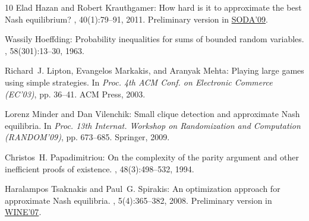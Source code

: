 \begin{thebibliography}{10}
{\sc Elad Hazan and Robert Krauthgamer}: How hard is it to approximate the best
  {N}ash equilibrium?
, 40(1):79--91, 2011.
\newblock Preliminary version in
  \href{http://dl.acm.org/citation.cfm?id=1496849}{SODA'09}.
\newblock [\epfmtdoi{10.1137/090766991}]

{\sc Wassily Hoeffding}: Probability inequalities for sums of bounded random
  variables.
, 58(301):13--30, 1963.
\newblock [\epfmtdoi{10.1080/01621459.1963.10500830}]

{\sc Richard~J. Lipton, Evangelos Markakis, and Aranyak Mehta}: Playing large
  games using simple strategies.
\newblock In {\em Proc. 4th ACM Conf. on Electronic Commerce (EC'03)}, pp.
  36--41. ACM Press, 2003.
\newblock [\epfmtdoi{10.1145/779928.779933}]

{\sc Lorenz Minder and Dan Vilenchik}: Small clique detection and approximate
  {N}ash equilibria.
\newblock In {\em Proc. 13th Internat. Workshop on Randomization and
  Computation (RANDOM'09)}, pp. 673--685. Springer, 2009.
\newblock [\epfmtdoi{10.1007/978-3-642-03685-9\_50}]

{\sc Christos~H. Papadimitriou}: On the complexity of the parity argument and
  other inefficient proofs of existence.
, 48(3):498--532, 1994.
\newblock [\epfmtdoi{10.1016/S0022-0000(05)80063-7}]

{\sc Haralampos Tsaknakis and Paul~G. Spirakis}: An optimization approach for
  approximate {N}ash equilibria.
, 5(4):365--382, 2008.
\newblock Preliminary version in
  \href{http://dx.doi.org/10.1007/978-3-540-77105-0_8}{WINE'07}.
\newblock [\epfmtdoi{10.1080/15427951.2008.10129172}]

\end{thebibliography}
